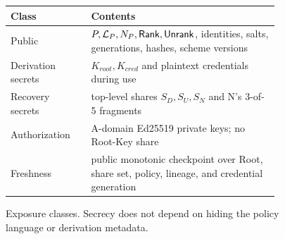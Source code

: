 \begin{figure}[t]
\centering
\small
\begin{tabular}{R{0.27\linewidth}R{0.63\linewidth}}
\toprule
Class & Contents \\
\midrule
Public & $P,\mathcal{L}_P,N_P,\mathsf{Rank},\mathsf{Unrank}$, identities, salts, generations, hashes, scheme versions \\
Derivation secrets & $K_{root},K_{cred}$ and plaintext credentials during use \\
Recovery secrets & top-level shares $S_D,S_U,S_N$ and N's 3-of-5 fragments \\
Authorization & A-domain Ed25519 private keys; no Root-Key share \\
Freshness & public monotonic checkpoint over Root, share set, policy, lineage, and credential generation \\
\bottomrule
\end{tabular}
\caption{Exposure classes. Secrecy does not depend on hiding the policy
language or derivation metadata.}
\label{fig:exposure-boundary}
\end{figure}
